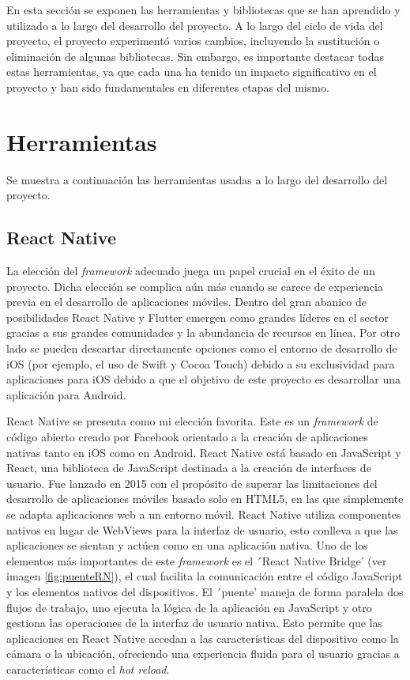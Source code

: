 
En esta sección se exponen las herramientas y bibliotecas que se han aprendido y utilizado a lo largo del desarrollo del proyecto.
A lo largo del ciclo de vida del proyecto, el proyecto experimentó varios cambios, incluyendo la sustitución o eliminación de algunas bibliotecas. Sin embargo, es importante destacar todas estas herramientas, ya que cada una ha tenido un impacto significativo en el proyecto y han sido fundamentales en diferentes etapas del mismo.

\section{Herramientas}

Se muestra a continuación las herramientas usadas a lo largo del desarrollo del proyecto.

\subsection{React Native}

La elección del \textit{framework} adecuado juega un papel crucial en el éxito de un proyecto. Dicha elección se complica aún más cuando se carece de experiencia previa en el desarrollo de aplicaciones móviles. Dentro del gran abanico de posibilidades React Native y Flutter emergen como grandes líderes en el sector gracias a sus grandes comunidades y la abundancia de recursos en línea. Por otro lado se pueden descartar directamente opciones como el entorno de desarrollo de iOS (por ejemplo, el uso de Swift y Cocoa Touch) debido a su exclusividad para aplicaciones para iOS debido a que el objetivo de este proyecto es desarrollar una aplicación para Android.

React Native se presenta como mi elección favorita. Este es un \textit{framework} de código abierto creado por Facebook orientado a la creación de aplicaciones nativas tanto en iOS como en Android. React Native está basado en JavaScript y React, una biblioteca de JavaScript destinada a la creación de interfaces de usuario. Fue lanzado en 2015 con el propósito de superar las limitaciones del desarrollo de aplicaciones móviles basado solo en HTML5, en las que simplemente se adapta aplicaciones web a un entorno móvil. React Native utiliza componentes nativos en lugar de WebViews para la interfaz de usuario, esto conlleva a que las aplicaciones se sientan y actúen como en una aplicación nativa.
Uno de los elementos más importantes de este \textit{framework} es el ´React Native Bridge' (ver imagen \ref{fig:puenteRN}), el cual facilita la comunicación entre el código JavaScript y los elementos nativos del dispositivos. El ´puente' maneja de forma paralela dos flujos de trabajo, uno ejecuta la lógica de la aplicación en JavaScript y otro gestiona las operaciones de la interfaz de usuario nativa. Esto permite que las aplicaciones en React Native accedan a las características del dispositivo como la cámara o la ubicación, ofreciendo una experiencia fluida para el usuario gracias a características como el \textit{hot reload}.

